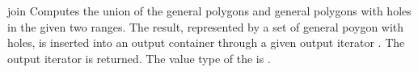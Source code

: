 \begin{ccRefFunction}{join}
{Computes the union of the general polygons and general polygons
with holes in the given two ranges. The result, represented by a set
of general poygon with holes, is inserted into an output container
through a given output iterator . The output iterator is
returned. The value type of the  is
.}

\ccSeeAlso
{}\\
\\
\\

\end{ccRefFunction}
